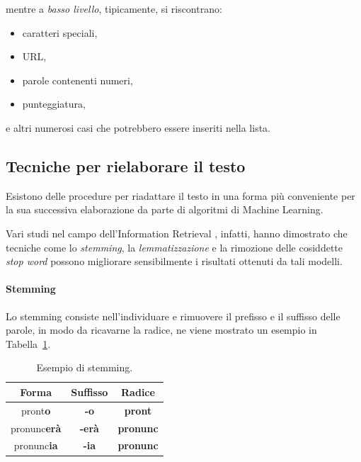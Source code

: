 \documentclass[12pt]{report}
\theoremstyle{definition}
\begin{document}
mentre a \textit{basso livello}, tipicamente, si riscontrano:
\begin{itemize}
    \item caratteri speciali,
    \item URL,
    \item parole contenenti numeri,
    \item punteggiatura,
\end{itemize}

e altri numerosi casi che potrebbero essere inseriti nella lista.
\subsection{Tecniche per rielaborare il testo}
Esistono delle procedure per riadattare il testo in una forma più conveniente per la sua successiva elaborazione da parte di algoritmi di Machine Learning.

Vari studi nel campo dell'Information Retrieval \cite{2, 22}, infatti, hanno dimostrato che tecniche come lo \textit{stemming}, la \textit{lemmatizzazione} e la rimozione delle cosiddette \textit{stop word} possono migliorare sensibilmente i risultati ottenuti da tali modelli.

\paragraph{Stemming} Lo stemming consiste nell'individuare e rimuovere il prefisso e il suffisso delle parole, in modo da ricavarne la radice, ne viene mostrato un esempio in Tabella~\ref{stemming}.
\begin{table}
\centering
 \begin{tabular}{|c|c|c|} 
 \hline 
 \textbf{Forma} & \textbf{Suffisso} & \textbf{Radice}
\\ [0.5ex] 
\hline
pront\textbf{o} & \textbf{-o} & \textbf{pront} \\
pronunc\textbf{erà} & \textbf{-erà} & \textbf{pronunc} \\
pronunc\textbf{ia} & \textbf{-ia} & \textbf{pronunc} \\
 \hline
\end{tabular}
\caption{Esempio di stemming.}
\label{stemming}
\end{table}
\end{document}
